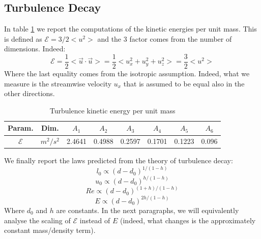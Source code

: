 \documentclass[11pt,titlepage]{article}
\begin{document}
\subsection{Turbulence Decay} \label{turbulence_decay}
In table \ref{tab5} we report the computations of the kinetic energies per unit mass. This is defined as $\mathcal{E} = 3/2<u^2>$ and the $3$ factor comes from the number of dimensions. Indeed: 
\begin{equation*}
	\mathcal{E} = \frac{1}{2} < \vec{u} \cdot \vec{u} >= \frac{1}{2} < u_x^2 + u_y^2 + u_z^2 > = \frac{3}{2} <u^2>
\end{equation*}
Where the last equality comes from the isotropic assumption. Indeed, what we measure is the streamwise velocity $u_x$ that is assumed to be equal also in the other directions.
\begin{table}[h!]
\centering
\caption{Turbulence kinetic energy per unit mass} \label{tab5}
    \begin{tabular}{ | c | c | c | c | c | c | c | c |}
        \hline
        Param. & Dim. & $A_1$ & $A_2$ & $A_3$ & $A_4$ & $A_5$ & $A_6$ \\
        \hline
        $\mathcal{E}$&$m^2/s^2$ &2.4641& 0.4988& 0.2597& 0.1701 & 0.1223 &0.096  \\
        \hline
    \end{tabular}
\end{table}
\newpage
We finally report the laws predicted from the theory of turbulence decay:
\begin{equation} \label{l_0_decay}
	l_0 \propto (d-d_0)^{1/(1-h)}
\end{equation}
\begin{equation}\label{u_0_decay}
	u_0 \propto (d-d_0)^{h/(1-h)}
\end{equation}
\begin{equation}\label{Re_decay}
	Re \propto (d-d_0)^{(1+h)/(1-h)}
\end{equation}
\begin{equation}\label{E_decay}
	E \propto (d-d_0)^{2h/(1-h)}
\end{equation}
Where $d_0$ and $h$ are constants. In the next paragraphs, we will equivalently analyse the scaling of $\mathcal{E}$ instead of $E$ (indeed, what changes is the approximately constant mass/density term).
\end{document}
